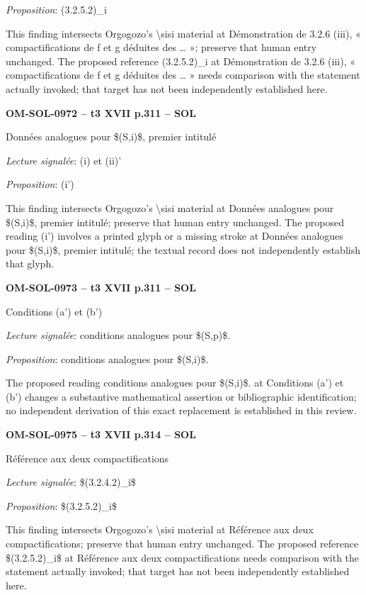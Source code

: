 \emph{Proposition}: (3.2.5.2)\_i\par
This finding intersects Orgogozo's \textbackslash{}sisi material at Démonstration de 3.2.6 (iii), « compactifications de f et g déduites des … »; preserve that human entry unchanged. The proposed reference (3.2.5.2)\_i at Démonstration de 3.2.6 (iii), « compactifications de f et g déduites des … » needs comparison with the statement actually invoked; that target has not been independently established here.\par
\par\noindent\textbf{OM-SOL-0972 -- t3 XVII p.311 -- SOL}\par
Données analogues pour \$(S,i)\$, premier intitulé\par
\emph{Lecture signalée}: (i) et (ii)'\par
\emph{Proposition}: (i')\par
This finding intersects Orgogozo's \textbackslash{}sisi material at Données analogues pour \$(S,i)\$, premier intitulé; preserve that human entry unchanged. The proposed reading (i') involves a printed glyph or a missing stroke at Données analogues pour \$(S,i)\$, premier intitulé; the textual record does not independently establish that glyph.\par
\par\noindent\textbf{OM-SOL-0973 -- t3 XVII p.311 -- SOL}\par
Conditions (a') et (b')\par
\emph{Lecture signalée}: conditions analogues pour \$(S,p)\$.\par
\emph{Proposition}: conditions analogues pour \$(S,i)\$.\par
The proposed reading conditions analogues pour \$(S,i)\$. at Conditions (a') et (b') changes a substantive mathematical assertion or bibliographic identification; no independent derivation of this exact replacement is established in this review.\par
\par\noindent\textbf{OM-SOL-0975 -- t3 XVII p.314 -- SOL}\par
Référence aux deux compactifications\par
\emph{Lecture signalée}: \$(3.2.4.2)\_i\$\par
\emph{Proposition}: \$(3.2.5.2)\_i\$\par
This finding intersects Orgogozo's \textbackslash{}sisi material at Référence aux deux compactifications; preserve that human entry unchanged. The proposed reference \$(3.2.5.2)\_i\$ at Référence aux deux compactifications needs comparison with the statement actually invoked; that target has not been independently established here.\par

